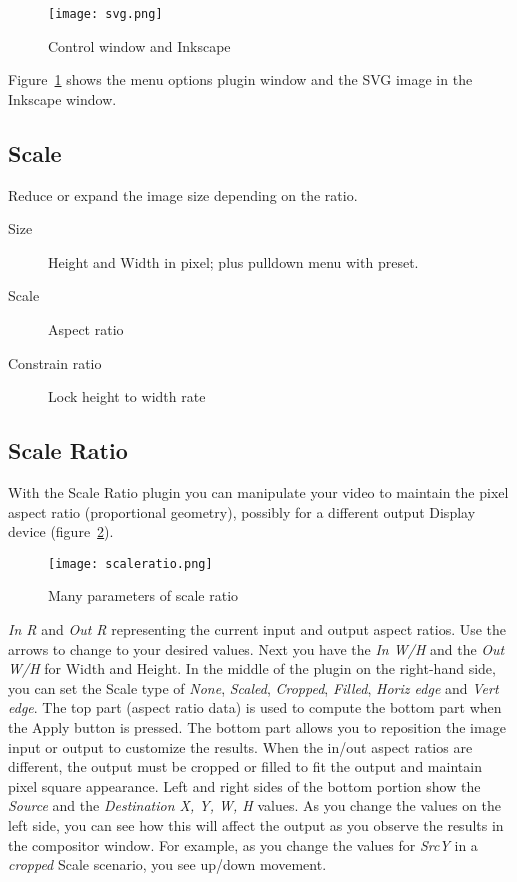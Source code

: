 \begin{figure}[hbtp]
	\centering
	\texttt{[image: svg.png]}
	\caption{Control window and Inkscape}
	\label{fig:svg}
\end{figure}

Figure~\ref{fig:svg} shows the menu options plugin window and the SVG image in the Inkscape window.

\subsection{Scale}%
\label{sub:scale}

Reduce or expand the image size depending on the ratio.

\begin{description}
    \item[Size] Height and Width in pixel; plus pulldown menu with preset.
    \item[Scale] Aspect ratio
    \item[Constrain ratio] Lock height to width rate
\end{description}

\subsection{Scale Ratio}%
\label{sub:scale_ratio}

With the Scale Ratio plugin you can manipulate your video to maintain the pixel aspect ratio (proportional geometry), possibly for a different output Display device (figure~\ref{fig:scaleratio}).

\begin{figure}[hbtp]
    \centering
    \texttt{[image: scaleratio.png]}
    \caption{Many parameters of scale ratio}
    \label{fig:scaleratio}
\end{figure}

\textit{In R} and \textit{Out R} representing the current input and output aspect ratios. Use the arrows to change to your desired values. Next you have the \textit{In W/H} and the \textit{Out W/H} for Width and Height. In the middle of the plugin on the right-hand side, you can set the Scale type of \textit{None}, \textit{Scaled}, \textit{Cropped}, \textit{Filled}, \textit{Horiz edge} and \textit{Vert edge}. The top part (aspect ratio data) is used to compute the bottom part when the Apply button is pressed. The bottom part allows you to reposition the image input or output to customize the results. When the in/out aspect ratios are different, the output must be cropped or filled to fit the output and maintain pixel square appearance. Left and right sides of the bottom portion show the \textit{Source} and the \textit{Destination X, Y, W, H} values. As you change the values on the left side, you can see how this will affect the output as you observe the results in the compositor window. For example, as you change the values for \textit{SrcY} in a \textit{cropped} Scale scenario, you see up/down movement.

